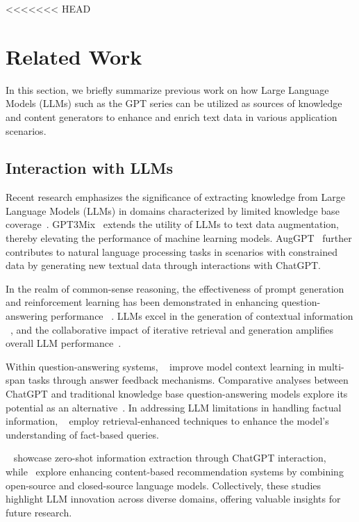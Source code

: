 <<<<<<< HEAD

\section{Related Work}
\label{sec:related}
In this section, we briefly summarize previous work on how Large Language Models (LLMs) such as the GPT series can be utilized as sources of knowledge and content generators to enhance and enrich text data in various application scenarios.
\subsection{Interaction with LLMs}
Recent research emphasizes the significance of extracting knowledge from Large Language Models (LLMs) in domains characterized by limited knowledge base coverage~\citep{fang2021leveraging}.
GPT3Mix~\citep{yoo2021gpt3mix} extends the utility of LLMs to text data augmentation, thereby elevating the performance of machine learning models. 
AugGPT~\citep{dai2023auggpt} further contributes to natural language processing tasks in scenarios with constrained data by generating new textual data through interactions with ChatGPT.

In the realm of common-sense reasoning, the effectiveness of prompt generation and reinforcement learning has been demonstrated in enhancing question-answering performance ~\citep{liu2021generated,liu2022rainier}. 
LLMs excel in the generation of contextual information ~\citep{yu2022generate}, 
and the collaborative impact of iterative retrieval and generation amplifies overall LLM performance~\citep{shao2023enhancing}.

Within question-answering systems, ~\citep{huang2023enhancing} improve model context learning in multi-span tasks through answer feedback mechanisms. 
Comparative analyses between ChatGPT and traditional knowledge base question-answering models explore its potential as an alternative~\citep{tan2023can}. 
In addressing LLM limitations in handling factual information, ~\citep{ren2023investigating} employ retrieval-enhanced techniques to enhance the model's understanding of fact-based queries.

~\citep{wei2023zero} showcase zero-shot information extraction through ChatGPT interaction, 
while~\citep{wei2023zero} explore enhancing content-based recommendation systems by combining open-source and closed-source language models. 
Collectively, these studies highlight LLM innovation across diverse domains, offering valuable insights for future research.

